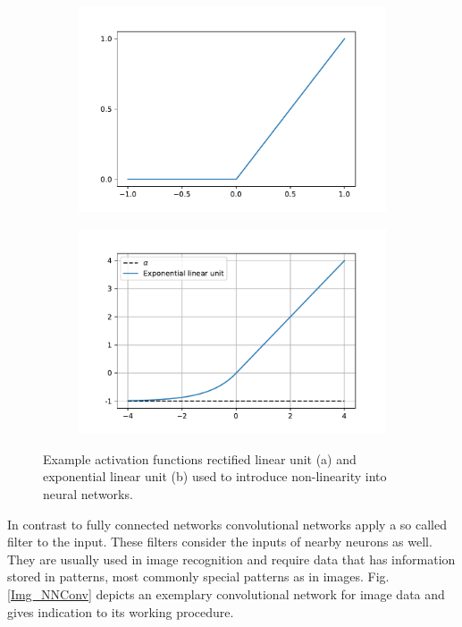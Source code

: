 			\begin{figure}
				\begin{subfigure}{.49\textwidth}
					\centering
					\includegraphics[width=\textwidth]{images/ReLU.pdf}
					\label{ReLU}
				\end{subfigure}
				\begin{subfigure}{.49\textheight}
					\centering
					\includegraphics[width=\textwidth]{images/Elu.pdf}
					\label{ELU}
				\end{subfigure}
				\caption{Example activation functions rectified linear unit (a) and  exponential linear unit (b) used to introduce non-linearity into neural networks.}
				\label{ReLUELU}
			\end{figure}
		
			In contrast to fully connected networks convolutional networks apply a so called filter to the input. These filters consider the inputs of nearby neurons as well. They are usually used in image recognition and require data that has information stored in patterns, most commonly special patterns as in images. Fig. \ref{Img_NNConv} depicts an exemplary convolutional network for image data and gives indication to its working procedure.
		
